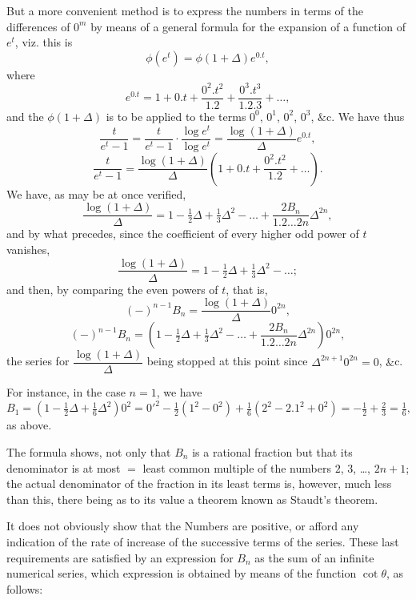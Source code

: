 \documentclass[11pt,a4paper]{article}
\begin{document}
But a more convenient method is to express the numbers in terms of the
differences of $0^m$ by means of a general formula for the expansion of a
function of $e^t$, viz. this is
\[
\phi(e^t) = \phi(1+\Delta)e^{0.t},
\]
where
\[
e^{0.t} = 1 + 0.t + \frac{0^2.t^2}{1.2} + \frac{0^3.t^3}{1.2.3} + \ldots,
\]
and the $\phi(1+\Delta)$ is to be applied to the terms $0^0$, $0^1$, $0^2$,
$0^3$, $\&$c. We have thus
\[
\frac{t}{e^t-1}
= \frac{t}{e^t-1}\cdot\frac{\log e^t}{\log e^t}
= \frac{\log(1+\Delta)}{\Delta}e^{0.t},
\]
\[
\frac{t}{e^t-1}
= \frac{\log(1+\Delta)}{\Delta}
  \left(1 + 0.t + \frac{0^2.t^2}{1.2} + \ldots\right).
\]
We have, as may be at once verified,
\[
\frac{\log(1+\Delta)}{\Delta}
= 1 - \tfrac{1}{2}\Delta + \tfrac{1}{3}\Delta^2 - \ldots
  + \frac{2B_n}{1.2\ldots 2n}\Delta^{2n},
\]
and by what precedes, since the coefficient of every higher odd power of $t$
vanishes,
\[
\frac{\log(1+\Delta)}{\Delta}
= 1 - \tfrac{1}{2}\Delta + \tfrac{1}{3}\Delta^2 - \ldots;
\]
and then, by comparing the even powers of $t$, that is,
\[
(-)^{n-1}B_n = \frac{\log(1+\Delta)}{\Delta}0^{2n},
\]
\[
(-)^{n-1}B_n
= \left(1 - \tfrac{1}{2}\Delta + \tfrac{1}{3}\Delta^2 - \ldots
  + \frac{2B_n}{1.2\ldots 2n}\Delta^{2n}\right)0^{2n},
\]
the series for $\dfrac{\log(1+\Delta)}{\Delta}$ being stopped at this point since
$\Delta^{2n+1}0^{2n}=0$, $\&$c.

For instance, in the case $n=1$, we have
\[
B_1 = \left(1 - \tfrac{1}{2}\Delta + \tfrac{1}{6}\Delta^2\right)0^2
    = 0'^2 - \tfrac{1}{2}(1^2-0^2) + \tfrac{1}{6}(2^2-2.1^2+0^2)
    = -\tfrac{1}{2} + \tfrac{2}{3} = \tfrac{1}{6},
\]
as above.

\newpage
The formula shows, not only that $B_n$ is a rational fraction but that its
denominator is at most $=$ least common multiple of the numbers $2$, $3$, \ldots,
$2n+1$; the actual denominator of the fraction in its least terms is, however,
much less than this, there being as to its value a theorem known as Staudt's
theorem.

It does not obviously show that the Numbers are positive, or afford any
indication of the rate of increase of the successive terms of the series.
These last requirements are satisfied by an expression for $B_n$ as the sum
of an infinite numerical series, which expression is obtained by means of the
function $\cot\theta$, as follows:
\end{document}
